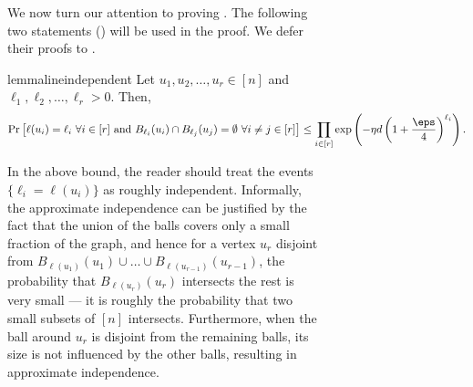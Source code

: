 \documentclass[11pt,letterpaper]{article}
\begin{document}
\begin{figure}
\begin{figure}
    We now turn our attention to proving .
    The following two statements () will be used in the proof.
    We defer their proofs to .
    \begin{restatable}{lemma}{lineindependent}
    \label{lem:independent-set-independent}
        Let $u_1,u_2,\ldots,u_r \in [n]$ and $\ell_1,\ell_2,\ldots,\ell_r > 0$. Then, 
        \[ \Pr\left[ \ell(u_i) = \ell_i \,\,\forall i \in [r]  \text{ and }  B_{\ell_i}(u_i) \cap B_{\ell_j}(u_j) = \emptyset \,\,\forall i\neq j \in [r]\right] \le \prod_{i \in [r]} \exp\left(-\eta d \left(1+\frac{\eps}{4}\right)^{\ell_i}\right). \]
    \end{restatable}
    \begin{remark}
        In the above bound, the reader should treat the events $\{\ell_i = \ell(u_i)\}$ as roughly independent.
        Informally, the approximate independence can be justified by the fact that the union of the balls covers only a small fraction of the graph, and hence for a vertex $u_r$ disjoint from $B_{\ell(u_1)}(u_1)\cup\dots\cup B_{\ell(u_{r-1})}(u_{r-1})$, the probability that $B_{\ell(u_r)}(u_r)$ intersects the rest is very small --- it is roughly the probability that two small subsets of $[n]$ intersects.
        Furthermore, when the ball around $u_r$ is disjoint from the remaining balls, its size is not influenced by the other balls, resulting in approximate independence.
    \end{remark}
    

\end{figure}
\end{figure}
\end{document}
